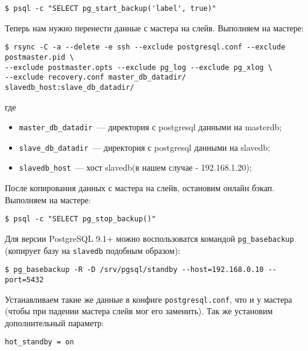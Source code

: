 \begin{lstlisting}[label=lst:streaming10,caption=Выполняем на мастере]
$ psql -c "SELECT pg_start_backup('label', true)"
\end{lstlisting}

Теперь нам нужно перенести данные с мастера на слейв. Выполняем на мастере:

\begin{lstlisting}[label=lst:streaming11,caption=Выполняем на мастере]
$ rsync -C -a --delete -e ssh --exclude postgresql.conf --exclude postmaster.pid \
--exclude postmaster.opts --exclude pg_log --exclude pg_xlog \
--exclude recovery.conf master_db_datadir/ slavedb_host:slave_db_datadir/
\end{lstlisting}

где

\begin{itemize}
  \item \lstinline!master_db_datadir!~--- директория с postgresql данными на masterdb;
  \item \lstinline!slave_db_datadir!~--- директория с postgresql данными на slavedb;
  \item \lstinline!slavedb_host!~--- хост slavedb(в нашем случае - 192.168.1.20);
\end{itemize}

После копирования данных с мастера на слейв, остановим онлайн бэкап. Выполняем на мастере:

\begin{lstlisting}[label=lst:streaming12,caption=Выполняем на мастере]
$ psql -c "SELECT pg_stop_backup()"
\end{lstlisting}

Для версии PostgreSQL 9.1+ можно воспользоватся командой \lstinline!pg_basebackup! (копирует базу на \lstinline!slavedb! подобным образом):

\begin{lstlisting}[label=lst:streaming122,caption=Выполняем на слейве]
$ pg_basebackup -R -D /srv/pgsql/standby --host=192.168.0.10 --port=5432
\end{lstlisting}

Устанавливаем такие же данные в конфиге \lstinline!postgresql.conf!, что и у мастера (чтобы при падении мастера слейв мог его заменить). Так же установим дополнительный параметр:

\begin{lstlisting}[label=lst:streaming13,caption=Конфиг слейва]
hot_standby = on
\end{lstlisting}


